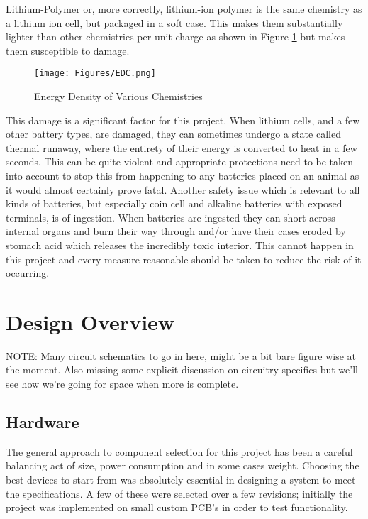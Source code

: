 \documentclass[12pt,openany,a4paper]{book}
\begin{document}
			Lithium-Polymer or, more correctly, lithium-ion polymer is the same chemistry as a lithium ion cell, but packaged in a soft case. This makes them substantially lighter than other chemistries per unit charge as shown in Figure \ref{fig:BAT} but makes them susceptible to damage. \\
			
			\begin{figure}[H]
				\centering
				\texttt{[image: Figures/EDC.png]}
				\caption{Energy Density of Various Chemistries \cite{icc}}
				\label{fig:BAT}
			\end{figure}		
	
			This damage is a significant factor for this project. When lithium cells, and a few other battery types, are damaged, they can sometimes undergo a state called thermal runaway, where the entirety of their energy is converted to heat in a few seconds. This can be quite violent and appropriate protections need to be taken into account to stop this from happening to any batteries placed on an animal as it would almost certainly prove fatal. Another safety issue which is relevant to all kinds of batteries, but especially coin cell and alkaline batteries with exposed terminals, is of ingestion. When batteries are ingested they can short across internal organs and burn their way through and/or have their cases eroded by stomach acid which releases the incredibly toxic interior. This cannot happen in this project and every measure reasonable should be taken to reduce the risk of it occurring.

\chapter{Design Overview}
	NOTE: Many circuit schematics to go in here, might be a bit bare figure wise at the moment. Also missing some explicit discussion on circuitry specifics but we'll see how we're going for space when more is complete. \\ \noindent\makebox[\linewidth]{\rule{\paperwidth}{0.4pt}}
	\noindent\makebox[\linewidth]{\rule{\paperwidth}{0.4pt}}
	\section{Hardware} \label{sec:components}
		The general approach to component selection for this project has been a careful balancing act of size, power consumption and in some cases weight. Choosing the best devices to start from was absolutely essential in designing a system to meet the specifications. A few of these were selected over a few revisions; initially the project was implemented on small custom PCB's in order to test functionality. \\
		
\end{document}
